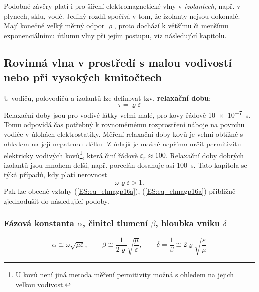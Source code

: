         Podobné závěry platí i pro šíření elektromagnetické vlny v \emph{izolantech}, např. v 
        plynech, sklu, vodě. Jediný rozdíl spočívá v tom, že izolanty nejsou dokonalé. Mají konečně 
        velký měrný odpor \(\varrho\), proto dochází k většímu či menšímu exponenciálnímu útlumu 
        vlny při jejím postupu, viz následující kapitolu.

    \subsection{Rovinná vlna v prostředí s malou vodivostí nebo při vysokých kmitočtech}
      U vodičů, polovodičů a izolantů lze definovat tzv. \textbf{relaxační dobu}:
      \begin{equation}\label{ES:eq_elmagp42}
        \tau = \varrho\varepsilon
      \end{equation}
      Relaxační doby jsou pro vodivé látky velmi malé, pro kovy řádově \SI{10e-7}{\s}. Tomu 
      odpovídá čas potřebný k rovnoměrnému rozprostření náboje na povrchu vodiče v úlohách 
      elektrostatiky. Měření relaxační doby kovů je velmi obtížné s ohledem na její nepatrnou 
      délku. Z údajů je možné nepřímo určit permitivitu elektricky vodivých kovů\footnote{U 
      kovů není jiná metoda měření permitivity možná s ohledem na jejich velkou vodivost.}, která 
      činí řádově \(\varepsilon_r \approx 100\). Relaxační doby dobrých izolantů jsou mnohem delší, 
      např. porcelán dosahuje asi \SI{100}{\s}. Tato kapitola se týká případů, kdy platí nerovnost
      \begin{equation}\label{ES:eq_elmagp43}
        \omega\varrho\varepsilon > 1.
      \end{equation}
      Pak lze obecné vztahy (\ref{ES:eq_elmagp16a}), (\ref{ES:eq_elmagp16a}) přibližně zjednodušit 
      do následující podoby.

    \subsubsection{Fázová konstanta \(\alpha\), činitel tlumení \(\beta\), hloubka vniku 
                     \(\delta\)}
       \begin{equation}\label{ES:eq_elmagp44}
         \alpha \cong \omega\sqrt{\mu\varepsilon}, \qquad
         \beta  \cong \frac{1}{2\varrho}\sqrt{\frac{\mu}{\varepsilon}}, \qquad
         \delta = \frac{1}{\beta}\cong2\varrho\sqrt{\frac{\varepsilon}{\mu}}
       \end{equation}

